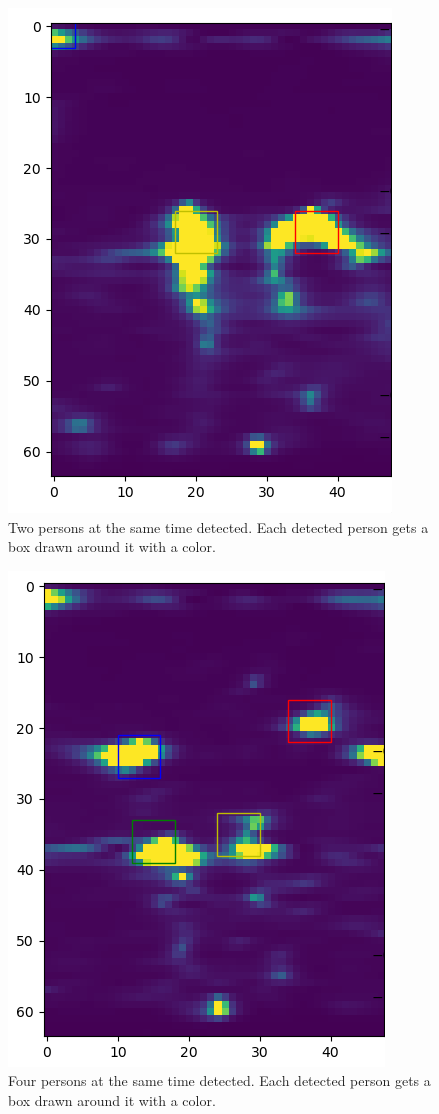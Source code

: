
\begin{figure}[t]
\centering
\includegraphics[width=.5\textwidth]{figures/people_detection/multiple_3_crop.png}
\caption{Two persons at the same time detected. Each detected person gets a box drawn around it with a color.}
\label{fig:person_detection_two}
\end{figure}

\begin{figure}[t]
\centering
\includegraphics[width=.5\textwidth]{figures/people_detection/4_2_crop.png}
\caption{Four persons at the same time detected. Each detected person gets a box drawn around it with a color.}
\label{fig:person_detection_four}
\end{figure}